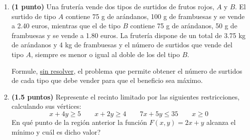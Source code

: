 
\begin{enumerate}[label=\alph*)]
  \item \textbf{(1 punto)} Una frutería vende dos tipos de surtidos de frutos
  rojos, $A$ y $B$. El surtido de tipo $A$ contiene 75 g de arándanos,
  100 g de frambuesas y se vende a 2.40 euros, mientras que el de tipo $B$
  contiene 75 g de arándanos, 50 g de frambuesas y se vende a 1.80 euros.
  La frutería dispone de un total de 3.75 kg de arándanos y 4 kg de frambuesas
  y el número de surtidos que vende del tipo $A$, siempre es menor o igual
  al doble de los del tipo $B$.

  Formule, \underline{sin resolver}, el problema que permite obtener el número
  de surtidos de cada tipo que debe vender para que el beneficio sea máximo.
  \item \textbf{(1.5 puntos)} Represente el recinto limitado por las siguientes
  restricciones, calculando sus vértices:
  \[
  x+4y\geq 5\qquad x+2y\geq 4\qquad 7x+5y\leq 35\qquad x\geq 0
  \]
  \textquestiondown{}En qué punto de la región anterior la función
  $F(x,y)=2x+y$ alcanza el mínimo y cuál es dicho valor?
\end{enumerate}
